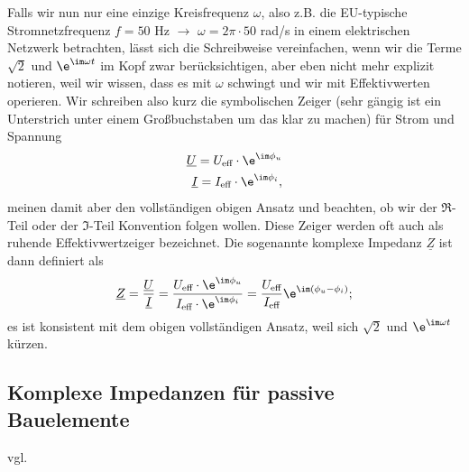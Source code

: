 Falls wir nun nur eine einzige Kreisfrequenz $\omega$, also z.B. die
EU-typische Stromnetzfrequenz $f=50$ Hz $\rightarrow$ $\omega = 2\pi \cdot 50$ rad/s
in einem elektrischen Netzwerk betrachten, lässt sich die Schreibweise vereinfachen,
wenn wir die Terme $\sqrt{2}$ und $\e^{\im \omega t}$ im Kopf zwar berücksichtigen,
aber eben nicht mehr explizit notieren, weil wir wissen, dass es mit $\omega$
schwingt und wir mit Effektivwerten operieren.
Wir schreiben also kurz die symbolischen Zeiger (sehr gängig ist ein Unterstrich
unter einem Großbuchstaben um das klar zu machen) für Strom und Spannung
\begin{align}
\underline{U} = U_\text{eff} \cdot \e^{\im \phi_u}\\
\underline{I} = I_\text{eff} \cdot \e^{\im \phi_i},
\end{align}
meinen damit aber den vollständigen obigen Ansatz und beachten, ob wir der
$\Re$-Teil oder der $\Im$-Teil Konvention folgen wollen.
%
Diese Zeiger werden oft auch als ruhende Effektivwertzeiger bezeichnet.
%
Die sogenannte komplexe Impedanz $\underline{Z}$ ist dann definiert als
\begin{align}
\underline{Z} =
\frac{\underline{U}}{\underline{I}} =
\frac{U_\text{eff} \cdot \e^{\im \phi_u}}{I_\text{eff} \cdot \e^{\im \phi_i}} =
\frac{U_\text{eff}}{I_\text{eff}} \e^{\im (\phi_u-\phi_i)};
\end{align}
es ist konsistent mit dem
obigen vollständigen Ansatz, weil sich $\sqrt{2}$ und $\e^{\im\omega t}$ kürzen.

\subsection{Komplexe Impedanzen für passive Bauelemente}

vgl. \cite[Kap. 10.3.5]{Marinescu2020}

